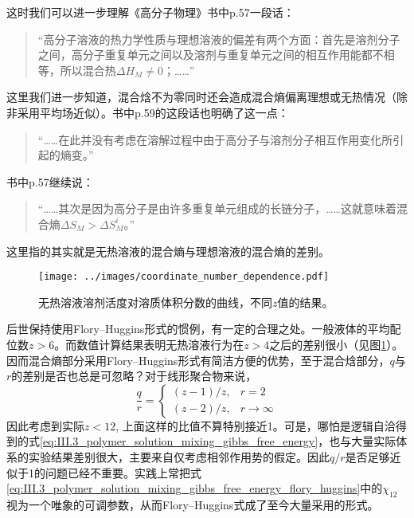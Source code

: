 \documentclass[main.tex]{subfiles}
\begin{document}
这时我们可以进一步理解《高分子物理》书中p.57一段话：
\begin{quotation}
  “高分子溶液的热力学性质与理想溶液的偏差有两个方面：首先是溶剂分子之间，高分子重复单元之间以及溶剂与重复单元之间的相互作用能都不相等，所以混合热$\Delta H_M\neq 0$；……”
\end{quotation}
这里我们进一步知道，混合焓不为零同时还会造成混合熵偏离理想或无热情况（除非采用平均场近似）。书中p.59的这段话也明确了这一点：
\begin{quotation}
  “……在此并没有考虑在溶解过程中由于高分子与溶剂分子相互作用变化所引起的熵变。”
\end{quotation}
书中p.57继续说：
\begin{quotation}
  “……其次是因为高分子是由许多重复单元组成的长链分子，……这就意味着混合熵$\Delta S_M>\Delta S_M^i$。”
\end{quotation}
这里指的其实就是无热溶液的混合熵与理想溶液的混合熵的差别。

\begin{figure}[ht]
  \centering
  \texttt{[image: ../images/coordinate\_number\_dependence.pdf]}
  \caption{无热溶液溶剂活度对溶质体积分数的曲线，不同$z$值的结果\cite{Tompa1956}。}
  \label{fig:coordinate_number_dependence}
\end{figure}

后世保持使用Flory--Huggins形式的惯例，有一定的合理之处。一般液体的平均配位数$z>6$。而数值计算结果表明无热溶液行为在$z>4$之后的差别很小（见图\ref{fig:coordinate_number_dependence}）。因而混合熵部分采用Flory--Huggins形式有简洁方便的优势，至于混合焓部分，$q$与$r$的差别是否也总是可忽略？对于线形聚合物来说，
\[
  \frac{q}{r}=\left\{\begin{array}{ll}\left(z-1\right)/z,& r=2\\\left(z-2\right)/z,&r\to\infty\end{array}\right.
\]
因此考虑到实际$z<12$, 上面这样的比值不算特别接近1。可是，哪怕是逻辑自洽得到的式\eqref{eq:III.3_polymer_solution_mixing_gibbs_free_energy}，也与大量实际体系的实验结果差别很大，主要来自仅考虑相邻作用势的假定。因此$q/r$是否足够近似于1的问题已经不重要。实践上常把式\eqref{eq:III.3_polymer_solution_mixing_gibbs_free_energy_flory_huggins}中的$\chi_{12}$视为一个唯象的可调参数，从而Flory--Huggins式成了至今大量采用的形式。
\end{document}
